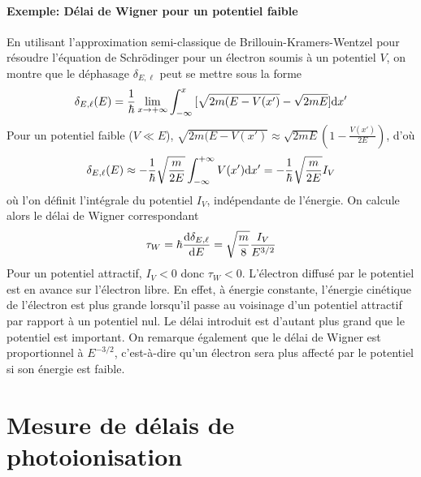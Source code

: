 \paragraph{Exemple: Délai de Wigner pour un potentiel faible}
En utilisant l'approximation semi-classique de Brillouin-Kramers-Wentzel pour résoudre l'équation de Schrödinger pour un électron soumis à un potentiel $V$, on montre que le déphasage $\delta_{E,\ell}$ peut se mettre sous la forme  
\begin{equation}
\delta_{E,\ell} (E) = \frac{1}{\hbar} \lim_{x \to + \infty} \int_{- \infty}^{x} { [\sqrt{2m(E-V(x')}-\sqrt{2mE}] \mathrm{d} x'}
\end{equation}
Pour un potentiel faible ($V \ll E $), $\sqrt{2m(E-V(x')} \approx \sqrt{2mE}(1-\frac{V(x')}{2E})$, d'où
\begin{equation}
\delta_{E,\ell} (E) \approx - \frac{1}{\hbar} \sqrt{\frac{m}{2E}} \int_{- \infty}^{+ \infty} { V(x')\mathrm{d} x'} = - \frac{1}{\hbar} \sqrt{\frac{m}{2E}} I_V
\end{equation}
où l'on définit l'intégrale du potentiel $I_V$, indépendante de l'énergie.
On calcule alors le délai de Wigner correspondant
\begin{equation}
\tau_W = \hbar \frac{\mathrm{d} \delta_{E,\ell}}{\mathrm{d} E} = \sqrt{\frac{m}{8}} \frac{I_V}{E^{3/2}}
\end{equation}
Pour un potentiel attractif, $I_V < 0$ donc $\tau_W < 0$. L'électron diffusé par le potentiel est en avance sur l'électron libre. En effet, à énergie constante, l'énergie cinétique de l'électron est plus grande lorsqu'il passe au voisinage d'un potentiel attractif par rapport à un potentiel nul. Le délai introduit est d'autant plus grand que le potentiel est important.
On remarque également que le délai de Wigner est proportionnel à $E^{-3/2}$, c'est-à-dire qu'un électron sera plus affecté par le potentiel si son énergie est faible.


\section{Mesure de délais de photoionisation}
